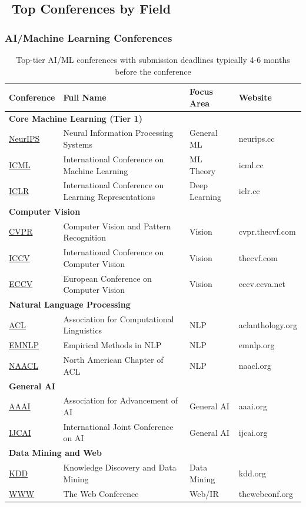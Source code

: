 \documentclass[11pt,a4paper]{article}
\begin{document}
\subsection{\faTrophy~Top Conferences by Field}

\subsubsection{AI/Machine Learning Conferences}

\begin{table}[H]
\centering
\begin{tabular}{@{}llll@{}}
\toprule
\textbf{Conference} & \textbf{Full Name} & \textbf{Focus Area} & \textbf{Website} \\
\midrule
\multicolumn{4}{l}{\textbf{Core Machine Learning (Tier 1)}} \\
\href{https://neurips.cc/}{NeurIPS} & Neural Information Processing Systems & General ML & neurips.cc \\
\href{https://icml.cc/}{ICML} & International Conference on Machine Learning & ML Theory & icml.cc \\
\href{https://iclr.cc/}{ICLR} & International Conference on Learning Representations & Deep Learning & iclr.cc \\
\midrule
\multicolumn{4}{l}{\textbf{Computer Vision}} \\
\href{https://cvpr.thecvf.com/}{CVPR} & Computer Vision and Pattern Recognition & Vision & cvpr.thecvf.com \\
\href{https://iccv2023.thecvf.com/}{ICCV} & International Conference on Computer Vision & Vision & thecvf.com \\
\href{https://eccv.ecva.net/}{ECCV} & European Conference on Computer Vision & Vision & eccv.ecva.net \\
\midrule
\multicolumn{4}{l}{\textbf{Natural Language Processing}} \\
\href{https://aclanthology.org/}{ACL} & Association for Computational Linguistics & NLP & aclanthology.org \\
\href{https://2024.emnlp.org/}{EMNLP} & Empirical Methods in NLP & NLP & emnlp.org \\
\href{https://naacl.org/}{NAACL} & North American Chapter of ACL & NLP & naacl.org \\
\midrule
\multicolumn{4}{l}{\textbf{General AI}} \\
\href{https://aaai.org/}{AAAI} & Association for Advancement of AI & General AI & aaai.org \\
\href{https://ijcai.org/}{IJCAI} & International Joint Conference on AI & General AI & ijcai.org \\
\midrule
\multicolumn{4}{l}{\textbf{Data Mining and Web}} \\
\href{https://kdd.org/}{KDD} & Knowledge Discovery and Data Mining & Data Mining & kdd.org \\
\href{https://www2024.thewebconf.org/}{WWW} & The Web Conference & Web/IR & thewebconf.org \\
\bottomrule
\end{tabular}
\caption{Top-tier AI/ML conferences with submission deadlines typically 4-6 months before the conference}
\end{table}
\end{document}
